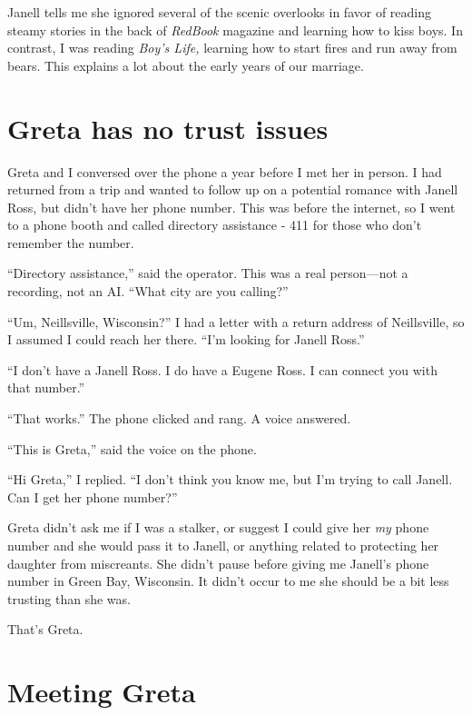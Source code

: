 \documentclass[
  letterpaper,
  DIV=11,
  numbers=noendperiod]{scrreprt}
\begin{document}
Janell tells me she ignored several of the scenic overlooks in favor of
reading steamy stories in the back of \emph{RedBook} magazine and
learning how to kiss boys. In contrast, I was reading \emph{Boy's Life,}
learning how to start fires and run away from bears. This explains a lot
about the early years of our marriage.

\section*{Greta has no trust issues}\label{greta-has-no-trust-issues}


Greta and I conversed over the phone a year before I met her in person.
I had returned from a trip and wanted to follow up on a potential
romance with Janell Ross, but didn't have her phone number. This was
before the internet, so I went to a phone booth and called directory
assistance - 411 for those who don't remember the number.

``Directory assistance,'' said the operator. This was a real
person---not a recording, not an AI. ``What city are you calling?''

``Um, Neillsville, Wisconsin?'' I had a letter with a return address of
Neillsville, so I assumed I could reach her there. ``I'm looking for
Janell Ross.''

``I don't have a Janell Ross. I do have a Eugene Ross. I can connect you
with that number.''

``That works.'' The phone clicked and rang. A voice answered.

``This is Greta,'' said the voice on the phone.

``Hi Greta,'' I replied. ``I don't think you know me, but I'm trying to
call Janell. Can I get her phone number?''

Greta didn't ask me if I was a stalker, or suggest I could give her
\emph{my} phone number and she would pass it to Janell, or anything
related to protecting her daughter from miscreants. She didn't pause
before giving me Janell's phone number in Green Bay, Wisconsin. It
didn't occur to me she should be a bit less trusting than she was.

That's Greta.

\section*{Meeting Greta}\label{meeting-greta}
\end{document}
